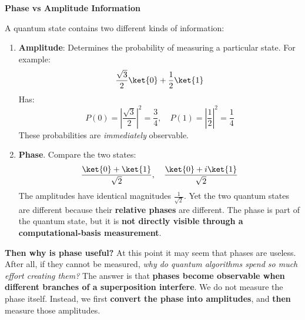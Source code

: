 \highspace
\begin{flushleft}
    \textcolor{DarkOrange3}{ \textbf{Phase vs Amplitude Information}}
\end{flushleft}
A quantum state contains two different kinds of information:
\begin{enumerate}
    \item \textbf{Amplitude}: Determines the probability of measuring a particular state. For example:
    \begin{equation*}
        \frac{\sqrt{3}}{2}\ket{0} + \frac{1}{2}\ket{1}
    \end{equation*}
    Has:
    \begin{equation*}
        P(0) = \left|\frac{\sqrt{3}}{2}\right|^2 = \frac{3}{4}, \quad P(1) = \left|\frac{1}{2}\right|^2 = \frac{1}{4}
    \end{equation*}
    These probabilities are \emph{immediately} observable.


    \item \textbf{Phase}. Compare the two states:
    \begin{equation*}
        \frac{\ket{0} + \ket{1}}{\sqrt{2}}, \quad \frac{\ket{0} + i\ket{1}}{\sqrt{2}}
    \end{equation*}
    The amplitudes have identical magnitudes $\frac{1}{\sqrt{2}}$. Yet the two quantum states are different because their \textbf{relative phases} are different. The phase is part of the quantum state, but it is \textbf{not directly visible through a computational-basis measurement}.
\end{enumerate}
\textcolor{Green3}{ \textbf{Then why is phase useful?}} At this point it may seem that phases are useless. After all, if they cannot be measured, \emph{why do quantum algorithms spend so much effort creating them?} The answer is that \textbf{phases become observable when different branches of a superposition interfere}. We do not measure the phase itself. Instead, we first \textbf{convert the phase into amplitudes}, and \textbf{then} measure those amplitudes.

